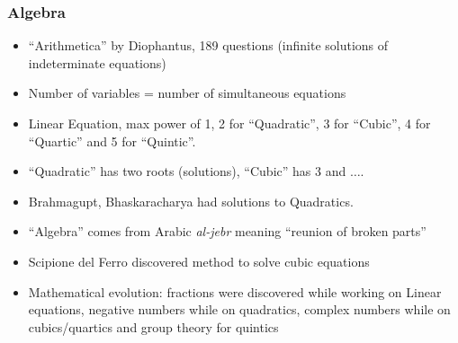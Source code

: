 \begin{frame}[fragile]
\begin{itemize}
\end{itemize}
\end{frame}


\begin{frame}[fragile]
\frametitle{Algebra}
\begin{itemize}
\item ``Arithmetica'' by Diophantus, 189 questions (infinite solutions of indeterminate equations)
\item Number of variables = number of simultaneous equations
\item Linear Equation, max power of 1, 2 for ``Quadratic'', 3  for ``Cubic'', 4 for ``Quartic'' and 5 for ``Quintic''.
\item ``Quadratic'' has two roots (solutions), ``Cubic'' has 3 and $\dots$.
\item Brahmagupt, Bhaskaracharya had solutions to Quadratics.
\item ``Algebra'' comes from Arabic {\it al-jebr} meaning ``reunion of broken parts''
\item Scipione del Ferro discovered method to solve cubic equations
\item Mathematical evolution: fractions were discovered while working on Linear equations, negative numbers while on quadratics, complex numbers while on cubics/quartics and group theory for quintics
\end{itemize}
\end{frame}

